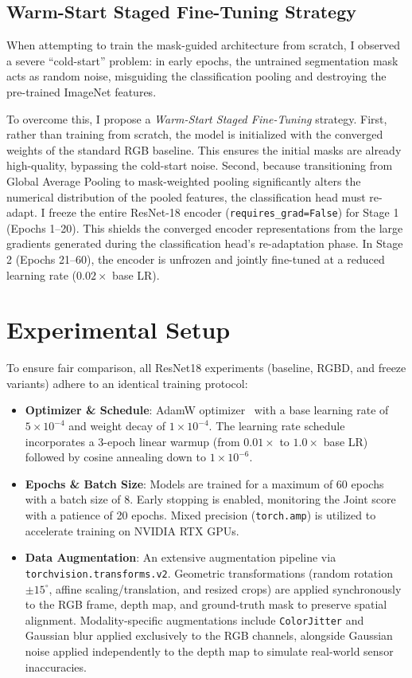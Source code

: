 \documentclass[conference]{IEEEtran}
\begin{document}
\subsection{Warm-Start Staged Fine-Tuning Strategy}
When attempting to train the mask-guided architecture from scratch, I observed a severe ``cold-start'' problem: in early epochs, the untrained segmentation mask acts as random noise, misguiding the classification pooling and destroying the pre-trained ImageNet features. 

To overcome this, I propose a \textit{Warm-Start Staged Fine-Tuning} strategy. First, rather than training from scratch, the model is initialized with the converged weights of the standard RGB baseline. This ensures the initial masks are already high-quality, bypassing the cold-start noise. Second, because transitioning from Global Average Pooling to mask-weighted pooling significantly alters the numerical distribution of the pooled features, the classification head must re-adapt. I freeze the entire ResNet-18 encoder (\texttt{requires\_grad=False}) for Stage 1 (Epochs 1--20). This shields the converged encoder representations from the large gradients generated during the classification head's re-adaptation phase. In Stage 2 (Epochs 21--60), the encoder is unfrozen and jointly fine-tuned at a reduced learning rate ($0.02\times$ base LR).

\section{Experimental Setup}
To ensure fair comparison, all ResNet18 experiments (baseline, RGBD, and freeze variants) adhere to an identical training protocol:
\begin{itemize}
    \item \textbf{Optimizer \& Schedule}: AdamW optimizer~\cite{loshchilov2019adamw} with a base learning rate of $5\times10^{-4}$ and weight decay of $1\times10^{-4}$. The learning rate schedule incorporates a 3-epoch linear warmup (from $0.01\times$ to $1.0\times$ base LR) followed by cosine annealing down to $1\times10^{-6}$.
    \item \textbf{Epochs \& Batch Size}: Models are trained for a maximum of 60 epochs with a batch size of 8. Early stopping is enabled, monitoring the Joint score with a patience of 20 epochs. Mixed precision (\texttt{torch.amp}) is utilized to accelerate training on NVIDIA RTX GPUs.
    \item \textbf{Data Augmentation}: An extensive augmentation pipeline via \texttt{torchvision.transforms.v2}. Geometric transformations (random rotation $\pm15^\circ$, affine scaling/translation, and resized crops) are applied synchronously to the RGB frame, depth map, and ground-truth mask to preserve spatial alignment. Modality-specific augmentations include \texttt{ColorJitter} and Gaussian blur applied exclusively to the RGB channels, alongside Gaussian noise applied independently to the depth map to simulate real-world sensor inaccuracies.
\end{itemize}
\end{document}
